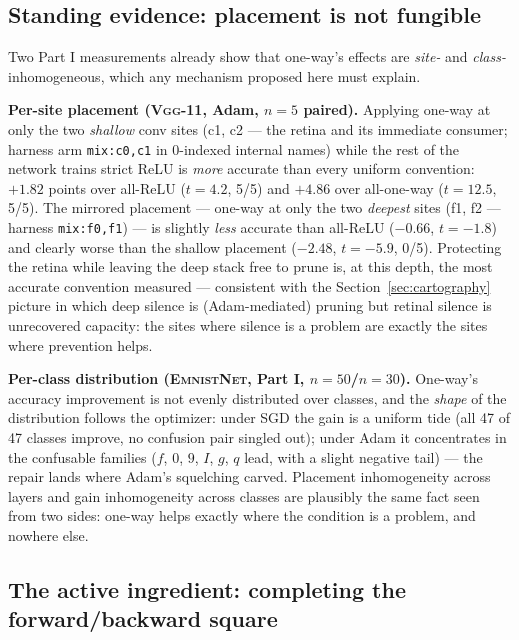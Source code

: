 \documentclass[11pt]{article}
\newcommand{\modelEmnistNet}{\textsc{EmnistNet}\xspace}
\newcommand{\modelVggEleven}{\textsc{Vgg-11}\xspace}
\begin{document}
\subsection{Standing evidence: placement is not fungible}
\label{sec:placement}

Two Part I measurements already show that one-way's effects are
\emph{site-} and \emph{class-}inhomogeneous, which any mechanism
proposed here must explain.

\textbf{Per-site placement (\modelVggEleven{}, Adam, $n{=}5$
paired).} Applying one-way at only the two \emph{shallow} conv
sites (c1, c2 --- the retina and its immediate consumer; harness
arm \texttt{mix:c0,c1} in 0-indexed internal names) while the rest
of the network trains strict ReLU is \emph{more} accurate than
every uniform convention:
$+1.82$ points over all-ReLU ($t{=}4.2$, 5/5) and $+4.86$ over
all-one-way ($t{=}12.5$, 5/5). The mirrored placement --- one-way at
only the two \emph{deepest} sites (f1, f2 --- harness
\texttt{mix:f0,f1}) --- is slightly
\emph{less} accurate than all-ReLU ($-0.66$, $t{=}{-}1.8$) and
clearly worse than the shallow placement ($-2.48$, $t{=}{-}5.9$,
0/5). Protecting the retina while leaving the deep stack free to
prune is, at this depth, the most accurate convention measured ---
consistent with the Section~\ref{sec:cartography} picture in which
deep silence is (Adam-mediated) pruning but retinal silence is
unrecovered capacity: the sites where silence is a problem are
exactly the sites where prevention helps.

\textbf{Per-class distribution (\modelEmnistNet{}, Part I,
$n{=}50$/$n{=}30$).} One-way's accuracy improvement is not evenly
distributed over classes, and the \emph{shape} of the distribution
follows the optimizer: under SGD the gain is a uniform tide (all 47
of 47 classes improve, no confusion pair singled out); under Adam it
concentrates in the confusable families ($f$, $0$, $9$, $I$, $g$,
$q$ lead, with a slight negative tail) --- the repair lands where
Adam's squelching carved. Placement inhomogeneity across layers and
gain inhomogeneity across classes are plausibly the same fact seen
from two sides: one-way helps exactly where the condition is a
problem, and nowhere else.

\subsection{The active ingredient: completing the
forward/backward square}
\label{sec:square}
\end{document}
